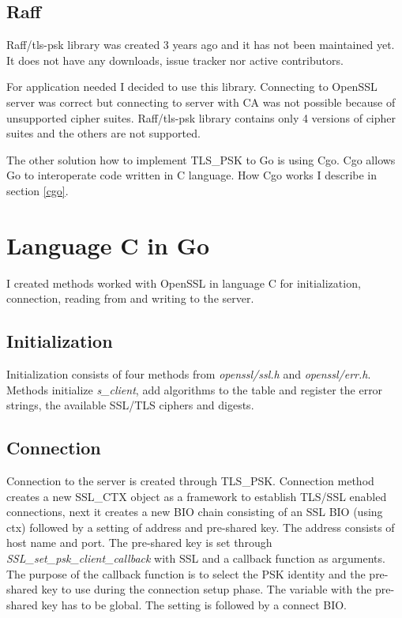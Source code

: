 \documentclass[
  digital, %
  notable,   %
  lof,     %
  lot,     %
]{fithesis3}
\begin{document}
\subsection{Raff}\label{raff}
Raff/tls-psk library was created 3 years ago and it has not been 
maintained yet. It does not have any downloads, issue tracker nor active contributors. 

For application needed I decided to use this library. Connecting to OpenSSL server was 
correct but connecting to server with CA was not possible because of unsupported cipher 
suites. Raff/tls-psk library contains only 4 versions of cipher suites and the others 
are not supported. 

The other solution how to implement TLS\_PSK to Go is using Cgo. Cgo allows Go to 
interoperate code written in C language. How Cgo works I describe in section \ref{cgo}. 


\section{Language C in Go}\label{langCinGo}
I created methods worked with OpenSSL in language C for initialization, connection, reading from 
and writing to the server.

\subsection{Initialization}
Initialization consists of four methods from \textit{openssl/ssl.h} and \textit{openssl/err.h}. 
Methods initialize \textit{s\_client}, add algorithms to the table and register the error strings, 
the available SSL/TLS ciphers and digests.

\subsection{Connection}\label{conn}
Connection to the server is created through TLS\_PSK. Connection method creates a new SSL\_CTX 
object as a framework to establish TLS/SSL enabled connections, next it creates a new BIO chain 
consisting of an SSL BIO (using ctx) followed by a setting of address and pre-shared key. The 
address consists of host name and port. The pre-shared key is set through 
\textit{SSL\_set\_psk\_client\_callback} with SSL and a callback function as arguments. The 
purpose of the callback function is to select the PSK identity and the pre-shared key to use 
during the connection setup phase. The variable with the pre-shared key has to be global. The 
setting is followed by a connect BIO.
\end{document}

